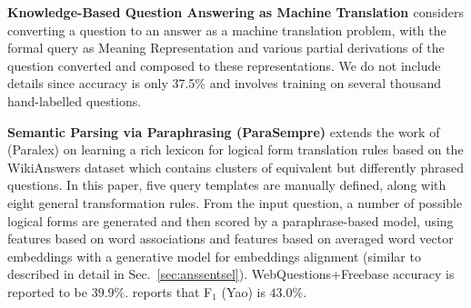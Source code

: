 \textbf{Knowledge-Based Question Answering as Machine Translation \citep{MTBao2014}}
	considers converting a question to an answer as a machine translation
	problem, with the formal query as Meaning Representation
	and various partial derivations of the question converted
	and composed to these representations.
	We do not include details since accuracy is only 37.5\%
	and involves training on several thousand hand-labelled questions.


\textbf{Semantic Parsing via Paraphrasing (ParaSempre)} \citep{SPBerant2014Paraphrase}
	extends the work of \cite{Fader2013Paraphrase} (Paralex)
	on learning a rich lexicon for logical form translation rules
	based on the WikiAnswers dataset which contains clusters of
	equivalent but differently phrased questions.
	In this paper,
	five query templates are manually defined, along with
	eight general transformation rules.
	From the input question, a number of possible logical forms
	are generated and then scored by a paraphrase-based model,
	using features based on word associations and features
	based on averaged word vector embeddings
	with a generative model for embeddings alignment (similar
	to \cite{Yu2014Deep} described in detail in Sec.~\ref{sec:anssentsel}).
	WebQuestions+Freebase accuracy is reported to be $39.9\%$.
	\cite{Semantic2014Borders} reports that F$_1$ (Yao) is $43.0\%$.

